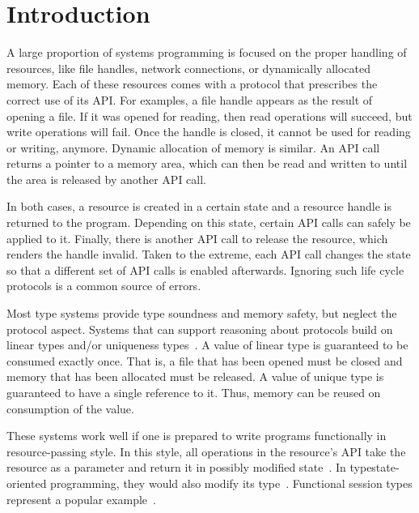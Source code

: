 \section{Introduction}

A large proportion of systems programming is focused on the proper
handling of resources, like file handles, network connections, or
dynamically allocated memory. Each of these resources comes with a
protocol that prescribes the correct use of its API.
For examples, a file handle appears as the result of opening a
file. If it was opened for reading, then read operations will succeed,
but write operations will fail. Once the handle is closed, it cannot
be used for reading or writing, anymore.
%
Dynamic allocation of memory is similar. An API call returns a
pointer to a memory area, which can then be read and written to until
the area is released by another API call.

In both cases, a resource is created in a certain state and a resource
handle is returned to the program. Depending on this state, certain API calls
can safely be applied to it. Finally, there is another API call to
release the resource, which renders the handle invalid.
Taken to the extreme, each API call changes the state so that a
different set of API calls is enabled afterwards.
Ignoring such life cycle protocols is a common source of errors.


Most type systems provide type soundness and memory safety, but neglect the
protocol aspect. Systems that can support reasoning about protocols
build on linear types \cite{DBLP:journals/tcs/Girard87} and/or
uniqueness types~\cite{DBLP:conf/plilp/BarendsenS95}. A value of linear
type is guaranteed to be consumed
exactly once. That is, a file that has been opened must be closed and
memory that has been allocated must be released. A value of unique
type is guaranteed to have a single reference to it. Thus, memory can
be reused on consumption of the value.

These systems work well if one is prepared to write programs
functionally in resource-passing style. In this style, all operations
in the resource's API take the resource as a parameter and return it
in possibly modified state~\cite{DBLP:journals/jfp/AchtenP95}. In
typestate-oriented programming, they would also modify its
type~\cite{DBLP:conf/oopsla/AldrichSSS09}. Functional session types
represent a popular
example~\cite{DBLP:journals/jfp/GayV10,lindley17:_light_funct_session_types}.

